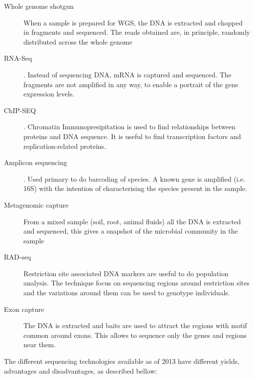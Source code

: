 \begin{description}
\item[Whole genome shotgun]  When a sample is prepared for WGS, the DNA is extracted and chopped in fragments  and sequenced. The reads obtained are, in principle, randomly distributed across the whole genome
\item[RNA-Seq].  Instead of sequencing DNA, mRNA is captured and sequenced. The fragments are not amplified in any way, to enable a portrait of the gene expression levels. 
\item[ChIP-SEQ]. Chromatin Immunopresipitation is used to find relationships between proteins and DNA sequence. It is useful to find transcription factors and replication-related proteins.
\item[Amplicon sequencing]. Used primary to do barcoding of species. A known gene is amplified (i.e. 16S) with the intention of characterising the species present in the sample. 
\item[Metagenomic capture] From a mixed sample (soil, root, animal fluids) all the DNA is extracted and sequenced, this gives a snapshot of the microbial community in the sample
\item[RAD-seq] Restriction site associated DNA markers are useful to do population analysis. The technique focus on sequencing regions around restriction sites and the variations around them can be used to genotype individuals. 
\item[Exon capture] The DNA is extracted and baits are used to attract the regions with motif common around exons. This allows to sequence only the genes and regions near them.  
\end{description}


The different sequencing technologies available as of 2013 have different yields, advantages and disadvantages, as described bellow:


